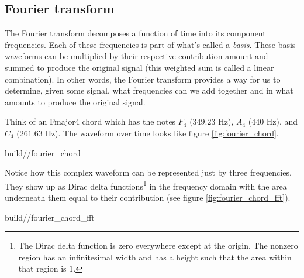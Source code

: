 \subsection{Fourier transform}

The Fourier transform decomposes a function of time into its component
frequencies. Each of these frequencies is part of what's called a
\textit{basis}. These basis waveforms can be multiplied by their respective
contribution amount and summed to produce the original signal (this weighted sum
is called a linear combination). In other words, the Fourier transform provides
a way for us to determine, given some signal, what frequencies can we add
together and in what amounts to produce the original signal.

Think of an Fmajor4 chord which has the notes $F_4$ ($349.23$ Hz), $A_4$ ($440$
Hz), and $C_4$ ($261.63$ Hz). The waveform over time looks like figure
\ref{fig:fourier_chord}.
\begin{svg}{build/\sectionpath/fourier_chord}
  \caption{Frequency decomposition of Fmajor4 chord}
  \label{fig:fourier_chord}
\end{svg}

Notice how this complex waveform can be represented just by three frequencies.
They show up as Dirac delta functions\footnote{The Dirac delta function is zero
everywhere except at the origin. The nonzero region has an infinitesimal width
and has a height such that the area within that region is $1$.} in the frequency
domain with the area underneath them equal to their contribution (see figure
\ref{fig:fourier_chord_fft}).
\begin{svg}{build/\sectionpath/fourier_chord_fft}
  \caption{Fourier transform of Fmajor4 chord}
  \label{fig:fourier_chord_fft}
\end{svg}
